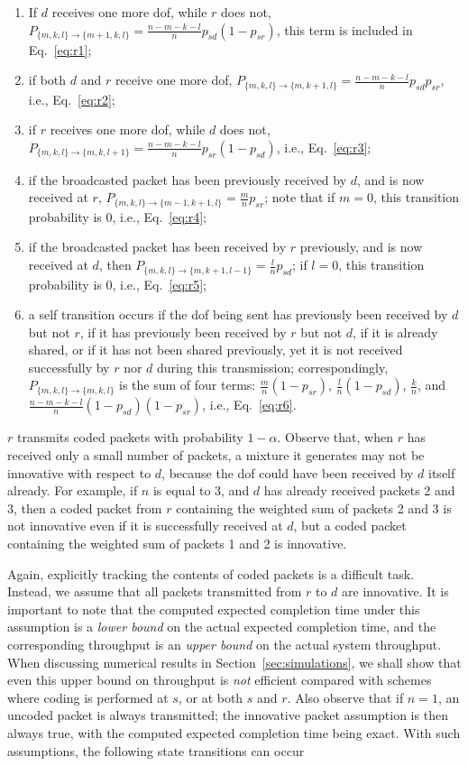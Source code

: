 \documentclass[journal, letterpaper]{IEEEtran}
\begin{document}
\begin{enumerate}
    \item If $d$ receives one more dof, while $r$ does not, $P_{\{m,k,l\}\rightarrow\{m+1,k,l\}} = \frac{n-m-k-l}{n}p_{sd}(1-p_{sr})$, this term is included in Eq.~\eqref{eq:r1};
    \item if both $d$ and $r$ receive one more dof, $P_{\{m,k,l\}\rightarrow\{m,k+1,l\}} = \frac{n-m-k-l}{n}p_{sd}p_{sr}$, i.e., Eq.~\eqref{eq:r2};
    \item if $r$ receives one more dof, while $d$ does not, $P_{\{m,k,l\}\rightarrow\{m,k,l+1\}} = \frac{n-m-k-l}{n}p_{sr}(1-p_{sd})$, i.e., Eq.~\eqref{eq:r3};
    \item if the broadcasted packet has been previously received by $d$, and is now received at $r$, $P_{\{m,k,l\}\rightarrow\{m-1,k+1,l\}} = \frac{m}{n}p_{sr}$; note that if $m=0$, this transition probability is 0, i.e., Eq.~\eqref{eq:r4};
    \item if the broadcasted packet has been received by $r$ previously, and is now received at $d$, then $P_{\{m,k,l\}\rightarrow\{m,k+1,l-1\}} = \frac{l}{n}p_{sd}$; if $l=0$, this transition probability is 0, i.e., Eq.~\eqref{eq:r5};
    \item a self transition occurs if the dof being sent has previously been received by $d$ but not $r$, if it has previously been received by $r$ but not $d$, if it is already shared, or if it has not been shared previously, yet it is not received successfully by $r$ nor $d$ during this transmission; correspondingly,
    $P_{\{m,k,l\}\rightarrow\{m,k,l\}}$ is the sum of four terms: $\frac{m}{n}(1-p_{sr})$, $\frac{l}{n}(1-p_{sd})$, $\frac{k}{n}$, and $\frac{n-m-k-l}{n}(1-p_{sd})(1-p_{sr})$, i.e., Eq.~\eqref{eq:r6}.
\end{enumerate}

$r$ transmits coded packets with probability  $1-\alpha$. Observe that, when $r$ has received only a small number of packets, a mixture it generates may not be innovative with respect to $d$, because the dof could have been received by $d$ itself already. For example, if $n$ is equal to 3, and $d$ has already received packets 2 and 3, then a coded packet from $r$ containing the weighted sum of packets 2 and 3 is not innovative even if it is successfully received at $d$, but a coded packet containing the weighted sum of packets 1 and 2 is innovative.

Again, explicitly tracking the contents of coded packets is a difficult task. Instead, we assume that all packets transmitted from $r$ to $d$ are innovative. It is important to note that the computed expected completion time under this assumption is a \emph{lower bound} on the actual expected completion time, and the corresponding throughput is an \emph{upper bound} on the actual system throughput. When discussing numerical results in Section~\ref{sec:simulations}, we shall show that even this upper bound on throughput is \emph{not} efficient compared with schemes where coding is performed at $s$, or at both $s$ and $r$. Also observe that if $n=1$, an uncoded packet is always transmitted; the innovative packet assumption is then always true, with the computed expected completion time being exact. With such assumptions, the following state transitions can occur
\end{document}
